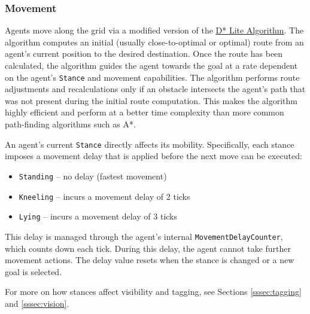 \documentclass[a4paper,english,DIV=16,11pt,parskip=half,dvipsnames,listof=totoc,index=totoc,bibliography=totoc]{scrartcl}
\begin{document}
\subsubsection{Movement} \label{sssec:movement}
Agents move along the grid via a modified version of the \href{http://idm-lab.org/bib/abstracts/papers/aaai02b.pdf}{D* Lite Algorithm}. The algorithm computes an initial (usually close-to-optimal or optimal) route from an agent's current position to the desired destination. Once the route has been calculated, the algorithm guides the agent towards the goal at a rate dependent on the agent's \texttt{Stance} and movement capabilities. The algorithm performs route adjustments and recalculations only if an obstacle intersects the agent's path that was not present during the initial route computation. This makes the algorithm highly efficient and perform at a better time complexity than more common path-finding algorithms such as A*.

An agent's current \texttt{Stance} directly affects its mobility. Specifically, each stance imposes a movement delay that is applied before the next move can be executed:
\begin{itemize}
  \item \texttt{Standing} – no delay (fastest movement)
  \item \texttt{Kneeling} – incurs a movement delay of 2 ticks
  \item \texttt{Lying} – incurs a movement delay of 3 ticks
\end{itemize}

This delay is managed through the agent’s internal \texttt{MovementDelayCounter}, which counts down each tick. During this delay, the agent cannot take further movement actions. The delay value resets when the stance is changed or a new goal is selected.

For more on how stances affect visibility and tagging, see Sections \ref{sssec:tagging} and \ref{sssec:vision}.

%
\end{document}
